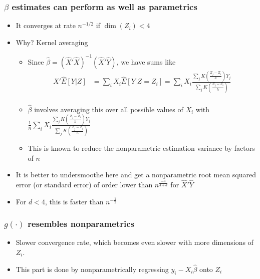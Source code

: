\documentclass[aspectratio=169]{beamer}
\begin{document}
\begin{frame}
\frametitle{$\beta$ estimates can perform as well as parametrics}
\begin{itemize}
\item It converges at rate $n^{-1/2}$ if $\dim(Z_i)<4$
\item Why? Kernel averaging
\begin{itemize}
\item Since $\hat{\beta} = (\widehat{X}'\widehat{X})^{-1} (\widehat{X}'\widehat{Y})$, we have sums like
\[
\begin{aligned}
X'\widehat{E}[Y|Z]&=\sum_{i}X_i\widehat{E}[Y|Z=Z_i]=\sum_{i}X_i\frac{\sum_jK\left(\frac{Z_j-Z_i}{h}\right)Y_j}{\sum_jK\left(\frac{Z_j-Z_i}{h}\right)}\\
\end{aligned}
\]
\item $\hat{\beta}$ involves averaging this over all possible values of $X_i$ with$\frac{1}{n}\sum_{i}X_i\frac{\sum_jK\left(\frac{Z_j-Z_i}{h}\right)Y_j}{\sum_jK\left(\frac{Z_j-Z_i}{h}\right)}$
\item This is known to reduce the nonparametric estimation variance by factors of $n$
\end{itemize}
\item It is better to undersmoothe here and get a nonparametric root mean squared error (or standard error) of order lower than $n^{\frac{-4}{4+d}}$ for $\widehat{X}'\widehat{Y}$
\item For $d<4$, this is faster than $n^{-\frac{1}{2}}$
\end{itemize}
\end{frame}

\begin{frame}
\frametitle{$g(\cdot)$ resembles nonparametrics}
\begin{itemize}
\item Slower convergence rate, which becomes even slower with more dimensions of $Z_i$. 
\item This part is done by nonparametrically regressing $y_i-X_i\hat{\beta}$ onto $Z_i$
\end{itemize}
\end{frame}
\end{document}
